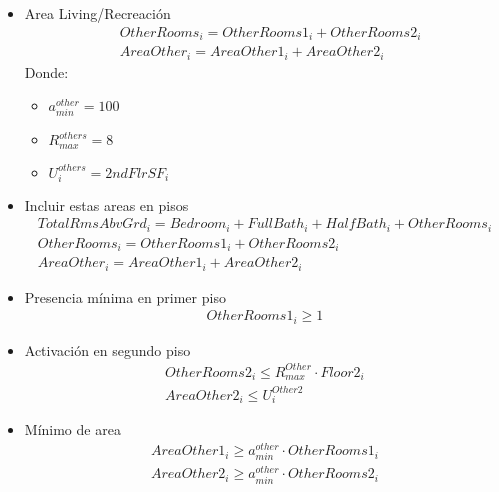 \begin{itemize}
    \item{Area Living/Recreación}
\begin{align}
    &OtherRooms_{i}=OtherRooms1_{i}+OtherRooms2_{i}\\
    &AreaOther_{i}=AreaOther1_{i}+AreaOther2_{i}
\end{align}
Donde:\\
    \begin{itemize}
        \item $a_{min}^{other}=100$
        \item $R_{max}^{others}=8$
        \item $U_{i}^{others}=2ndFlrSF_{i}$
    \end{itemize}
    \item{Incluir estas areas en pisos}
\begin{align}
    TotalRmsAbvGrd_{i}=Bedroom_{i}+FullBath_{i}+HalfBath_{i}+OtherRooms_{i}\\
    OtherRooms_{i}=OtherRooms1_{i}+OtherRooms2_{i}\\
    AreaOther_{i}=AreaOther1_{i}+AreaOther2_{i}
\end{align}
    \item {Presencia mínima en primer piso}
\begin{align}
    OtherRooms1_{i}\geq 1
\end{align}
    \item {Activación en segundo piso}
\begin{align}
    OtherRooms2_{i}\leq R_{max}^{Other}\cdot Floor2_{i}\\
    AreaOther2_{i}\leq U_{i}^{Other2}
\end{align}
    \item {Mínimo de area}
\begin{align}
    AreaOther1_{i}\geq a_{min}^{other}\cdot OtherRooms1_{i}\\
    AreaOther2_{i} \geq a_{min}^{other}\cdot OtherRooms2_{i}
\end{align}



\end{itemize}
